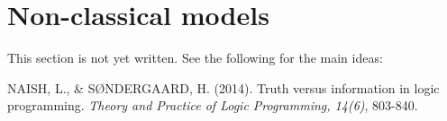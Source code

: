 \chapter{Non-classical models}
\label{sec:non-classical}

This section is not yet written.
See the following for the main ideas:

\bigskip
\noindent
NAISH, L., \& SØNDERGAARD, H. (2014).
Truth versus information in logic programming.
\emph{Theory and Practice of Logic Programming, 14(6)}, 803-840.
